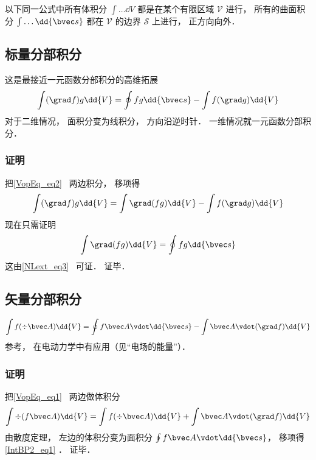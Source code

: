 

以下同一公式中所有体积分 $\int \dots \dd{V}$ 都是在某个有限区域 $\mathcal V$ 进行， 所有的曲面积分 $\int \dots \dd{\bvec s}$ 都在 $\mathcal V$ 的边界 $\mathcal S$ 上进行， 正方向向外．

\subsection{标量分部积分}
这是最接近一元函数分部积分的高维拓展
\begin{equation}\label{IntBP2_eq2}
\int (\grad f) g \dd{V} = \oint fg \dd{\bvec s} - \int f (\grad g) \dd{V}
\end{equation}
对于二维情况， 面积分变为线积分， 方向沿逆时针． 一维情况就一元函数分部积分．

\subsubsection{证明}
把\autoref{VopEq_eq2}~ 两边积分， 移项得
\begin{equation}
\int (\grad f) g \dd{V} = \int \grad (fg) \dd{V} - \int f (\grad g) \dd{V}
\end{equation}
现在只需证明
\begin{equation}
\int \grad (fg) \dd{V} = \oint fg \dd{\bvec s}
\end{equation}
这由\autoref{NLext_eq3}~ 可证． 证毕．

\subsection{矢量分部积分}
\begin{equation}\label{IntBP2_eq1}
\int f (\div \bvec A)\dd{V} =  \oint f \bvec A \vdot \dd{\bvec s} - \int\bvec A \vdot (\grad f)\dd{V}
\end{equation}
参考\cite{GriffE}， 在电动力学中有应用（见“电场的能量”）．

\subsubsection{证明}
把\autoref{VopEq_eq1}~ 两边做体积分
\begin{equation}
\int\div (f \bvec A) \dd{V} = \int f (\div \bvec A)\dd{V} + \int\bvec A \vdot (\grad f)\dd{V}
\end{equation}
由散度定理， 左边的体积分变为面积分 $\oint f \bvec A \vdot \dd{\bvec s}$， 移项得\autoref{IntBP2_eq1} ． 证毕．
